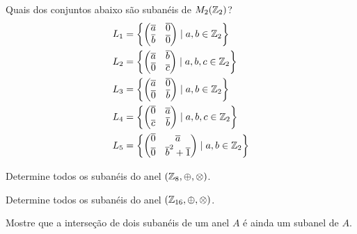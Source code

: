 \documentclass[12pt]{exam}
\begin{document}
    \vspace{.3cm}

    \questao{} Quais dos conjuntos abaixo s\~ao suban\'eis de $M_2(\mathbb{Z}_2)$?
    \begin{align*}
        L_1 &= \left\{\begin{pmatrix}
            \overline{a} & \overline{0}\\
            \overline{b} & \overline{0}
        \end{pmatrix} \mid a, b \in \mathbb{Z}_2\right\}\\
        L_2 &= \left\{\begin{pmatrix}
            \overline{a} & \overline{b}\\
            \overline{0} & \overline{c}
        \end{pmatrix} \mid a, b, c \in \mathbb{Z}_2\right\}\\
        L_3 &= \left\{\begin{pmatrix}
            \overline{a} & \overline{0}\\
            \overline{0} & \overline{b}
        \end{pmatrix} \mid a, b \in \mathbb{Z}_2\right\}\\
        L_4 &= \left\{\begin{pmatrix}
            \overline{0} & \overline{a}\\
            \overline{c} & \overline{b}
        \end{pmatrix} \mid a, b, c \in \mathbb{Z}_2\right\}\\
        L_5 &= \left\{\begin{pmatrix}
            \overline{0} & \overline{a}\\
            \overline{0} & \overline{b}^2 + \overline{1}
        \end{pmatrix} \mid a, b \in \mathbb{Z}_2\right\}
    \end{align*}

    \vspace{.3cm}

    \questao{} Determine todos os suban\'eis do anel $(\mathbb{Z}_8, \oplus, \otimes)$.

    \vspace{.3cm}

    \questao{} Determine todos os suban\'eis do anel $(\mathbb{Z}_{16}, \oplus, \otimes)$.

    \vspace{.3cm}

    \questao{} Mostre que a interse\c{c}\~ao de dois suban\'eis de um anel $A$ \'e ainda um subanel de $A$.
\end{document}
